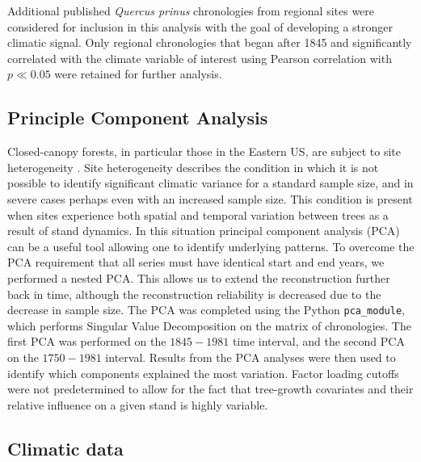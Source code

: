 \documentclass[11pt]{article}
\begin{document}

Additional published \textit{Quercus prinus} chronologies from regional sites were considered for inclusion in this analysis with the goal of developing a stronger climatic signal. Only regional chronologies that began after 1845 and significantly correlated with the climate variable of interest using Pearson correlation with $p \ll 0.05$ were retained for further analysis.

\subsection{Principle Component Analysis}

Closed-canopy forests, in particular those in the Eastern US, are subject to site heterogeneity \cite{peters1981principal}. Site heterogeneity describes the condition in which it is not possible to identify significant climatic variance for a standard sample size, and in severe cases perhaps even with an increased sample size. This condition is present when sites experience both spatial and temporal variation between trees as a result of stand dynamics. In this situation principal component analysis (PCA) can be a useful tool allowing one to identify underlying patterns. To overcome the PCA requirement that all series must have identical start and end years, we performed a nested PCA. This allows us to extend the reconstruction further back in time, although the reconstruction reliability is decreased due to the decrease in sample size. The PCA was completed using the Python \texttt{pca\_module}, which performs Singular Value Decomposition on the matrix of chronologies. The first PCA was performed on the $1845 - 1981$ time interval, and the second PCA on the $1750 - 1981$ interval. Results from the PCA analyses were then used to identify which components explained the most variation. Factor loading cutoffs were not predetermined to allow for the fact that tree-growth covariates and their relative influence on a given stand is highly variable.

\subsection{Climatic data}
\end{document}
